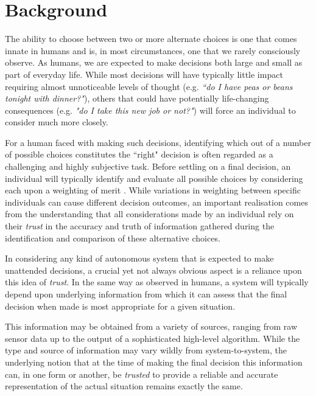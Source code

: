 \section{Background}

The ability to choose between two or more alternate choices is one that comes innate in humans and is, in most circumstances, one that we rarely consciously observe. As humans, we are expected to make decisions both large and small as part of everyday life. While most decisions will have typically little impact requiring almost unnoticeable levels of thought (e.g. \textit{``do I have peas or beans tonight with dinner?"}), others that could have potentially life-changing consequences (e.g. \textit{"do I take this new job or not?"}) will force an individual to consider much more closely.

For a human faced with making such decisions, identifying which out of a number of possible choices constitutes the ``right" decision is often regarded as a challenging and highly subjective task. %
Before settling on a final decision, an individual will typically identify and evaluate all possible choices by considering each upon a weighting of merit \cite{rational-decision-model}. While variations in weighting between specific individuals can cause different decision outcomes, an important realisation comes from the understanding that all considerations made by an individual rely on their \textit{trust} in the accuracy and truth of information gathered during the identification and comparison of these alternative choices.

 In considering any kind of autonomous system that is expected to make unattended decisions, a crucial yet not always obvious aspect is a reliance upon this idea of \textit{trust}. In the same way as observed in humans, a system will typically depend upon underlying information from which it can assess that the final decision when made is most appropriate for a given situation.
 
 This information may be obtained from a variety of sources, ranging from raw sensor data up to the output of a sophisticated high-level algorithm. While the type and source of information may vary wildly from system-to-system, the underlying notion that at the time of making the final decision this information can, in one form or another, be \textit{trusted} to provide a reliable and accurate representation of the actual situation remains exactly the same. 
 
